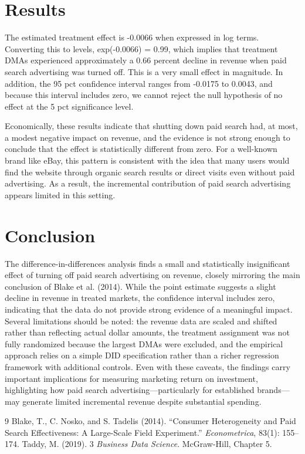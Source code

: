 \documentclass[12pt]{article}
\begin{document}
\section{Results}



The estimated treatment effect is -0.0066 when expressed in log terms. Converting this to levels, exp(-0.0066) = 0.99, which implies that treatment DMAs experienced approximately a 0.66 percent decline in revenue when paid search advertising was turned off. This is a very small effect in magnitude. In addition, the 95 pct confidence interval ranges from -0.0175 to 0.0043, and because this interval includes zero, we cannot reject the null hypothesis of no effect at the 5 pct significance level.

Economically, these results indicate that shutting down paid search had, at most, a modest negative impact on revenue, and the evidence is not strong enough to conclude that the effect is statistically different from zero. For a well-known brand like eBay, this pattern is consistent with the idea that many users would find the website through organic search results or direct visits even without paid advertising. As a result, the incremental contribution of paid search advertising appears limited in this setting.

\section{Conclusion}	

The difference-in-differences analysis finds a small and statistically insignificant effect of turning off paid search advertising on revenue, closely mirroring the main conclusion of Blake et al. (2014). While the point estimate suggests a slight decline in revenue in treated markets, the confidence interval includes zero, indicating that the data do not provide strong evidence of a meaningful impact. Several limitations should be noted: the revenue data are scaled and shifted rather than reflecting actual dollar amounts, the treatment assignment was not fully randomized because the largest DMAs were excluded, and the empirical approach relies on a simple DID specification rather than a richer regression framework with additional controls. Even with these caveats, the findings carry important implications for measuring marketing return on investment, highlighting how paid search advertising—particularly for established brands—may generate limited incremental revenue despite substantial spending.

\begin{thebibliography}{9}
Blake, T., C. Nosko, and S. Tadelis (2014).
``Consumer Heterogeneity and Paid Search Effectiveness: A Large-Scale Field Experiment.''
\textit{Econometrica}, 83(1): 155--174.
Taddy, M. (2019).
3
\textit{Business Data Science}. McGraw-Hill, Chapter 5.
\end{thebibliography}
\end{document}
